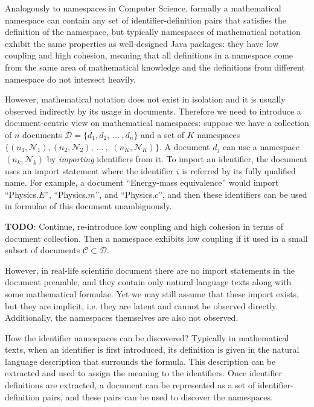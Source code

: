 
Analogously to namespaces in Computer Science, formally a mathematical namespace
can contain any set of identifier-definition pairs that satisfies the definition of
the namespace, but typically namespaces of mathematical notation
exhibit the same properties as well-designed Java packages: they
have low coupling and high cohesion, meaning that all definitions
in a namespace
come from the same area of mathematical knowledge and the definitions
from different namespace do not intersect heavily.

However, mathematical notation does not exist in isolation and it is usually
observed indirectly by its usage in documents.
Therefore we need to introduce a document-centric view on mathematical
namespaces: suppose we have a collection of $n$ documents
$\mathcal D = \{ d_1, d_2, \ ... \ , d_n \}$ and a set of $K$ namespaces
$\big\{(n_1, \mathcal N_1), (n_2, \mathcal N_2), \ ... \ ,$ $(n_K, \mathcal N_K) \big\}$.
A document $d_j$ can use a namespace $(n_k, \mathcal N_k)$ by \emph{importing}
identifiers from it. To import an identifier, the document uses an import statement
where the identifier $i$ is referred by its fully qualified name.
For example, a document ``Energy-mass equivalence'' would import
``Physics.$E$'', ``Physics.$m$'', and ``Physics.$c$'', and then
these identifiers can be used in formulae of this document unambiguously.


\textbf{TODO}: Continue, re-introduce low coupling and high cohesion in terms of
document collection.
Then a namespace exhibits low coupling if it used in a small subset
of documents $\mathcal C \subset \mathcal D$.

However, in real-life scientific document there are no import statements
in the document preamble, and they contain only natural language
texts along with some mathematical formulae. Yet we may still assume
that these import exists, but they are implicit, i.e. they are latent
and cannot be observed directly. Additionally, the namespaces themselves are
also not observed.

How the identifier namespaces can be discovered? Typically in mathematical
texts, when an identifier is first introduced, its definition is given
in the natural language description that surrounds the formula.
This description can be extracted and used to assign the meaning to
the identifiers. Once identifier definitions are extracted, a document
can be represented as a set of identifier-definition pairs,
and these pairs can be used to discover the namespaces.


